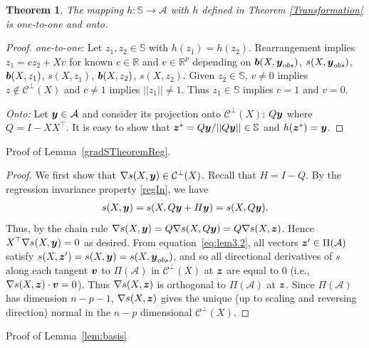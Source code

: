 \documentclass[ba]{imsart}
\newcommand{\by}{\mbox{\boldmath $y$}}
\newcommand{\bz}{\mbox{\boldmath $z$}}
\newcommand{\bv}{\mbox{\boldmath $v$}}
\newcommand{\bb}{\mbox{\boldmath $b$}}
\newcommand{\mc}{\mathcal}
\newtheorem{theorem}{Theorem}[section]
\begin{document}
\noindent
\begin{theorem}
The mapping $h:  \mathbb{S} \rightarrow \mathcal{A}$ with $h$ defined in Theorem \ref{Transformation} is one-to-one and onto. 
\end{theorem}
\begin{proof} 
\noindent 
\textit{one-to-one}: Let $z_{1}, z_{2} \in \mathbb{S}$ with $h(z_{1}) = h(z_{2})$. Rearrangement implies $z_{1} = cz_{2} + Xv$ for known $c\in \mathbb{R}$ and $v\in \mathbb{R}^{p}$ depending on $\bb(X,\by_{obs})$, $s(X,\by_{obs})$, $\bb(X,z_{1})$, $s(X,z_{1})$, $\bb(X,z_{2})$, $s(X,z_{2})$. Given $z_{2}\in \mathbb{S}$, $v\neq 0$ implies $z\notin \mathcal{C}^{\perp}(X)$ and $c\neq 1$ implies $||z_{1}|| \neq 1$. Thus $z_{1} \in \mathbb{S}$ implies $c=1$ and $v =0$. 

\noindent \textit{Onto:} Let $\by \in \mathcal{A}$ and consider its projection onto $\mathcal{C}^{\perp}(X)$: $Q\by$ where $Q = I - XX^{\top}$. It is easy to show that $\bz^{*} = Q\by/||Q\by|| \in \mathbb{S}$ and $h(\bz^{*}) = \by$.
\end{proof}

\noindent
Proof of Lemma~\ref{gradSTheoremReg}.
\begin{proof}
We first show that $\nabla s(X,\by)\in \mc{C}^\perp(X)$. Recall that
$H=I-Q$. By the regression invariance property \ref{regIn}, we have
\label{perpGradReg}
\begin{equation}
\label{eq:lem3.2}
\begin{aligned}
s(X,\by)=s(X, Q\by+H\by)=s(X, Q\by).
\end{aligned}
\end{equation}
Thus, by the chain rule $\nabla s(X,\by)=Q\nabla s(X,Q\by)=Q\nabla s(X, \bz)$. Hence $X^\top \nabla s(X,\by)=0$ as desired.
From equation~\eqref{eq:lem3.2}, all vectors $\bz'\in \Pi(\mathcal{A})$ satisfy $s(X,\bz')=
s(X,\by)=s(X,\by_{obs})$, and so all directional derivatives of $s$ along each tangent $\bv$ to
  $\Pi(\mathcal{A})$ in $\mc C^\perp(X)$ at $\bz$ are equal to 0 (i.e., $\nabla s(X,\bz) \cdot \bv=0$).  Thus $\nabla s(X,\bz)$ is orthogonal to  $\Pi(\mathcal{A})$ at $\bz$.  
Since $\Pi(\mathcal{A})$ has dimension $n-p-1$, $\nabla s(X,\bz)$ gives the unique (up to scaling and reversing direction) normal in the $n-p$ dimensional $\mc C^\perp(X)$.  
\end{proof}

\noindent
Proof of Lemma~\ref{lem:basis}
\end{document}
